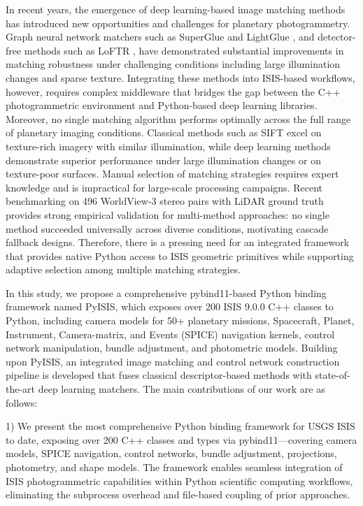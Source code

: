 \documentclass[lettersize,journal]{IEEEtran}
\newcommand{\pyisis}{PyISIS}
\begin{document}
In recent years, the emergence of deep learning-based image matching methods has introduced new opportunities and challenges for planetary photogrammetry. Graph neural network matchers such as SuperGlue \cite{sarlin2020superglue} and LightGlue \cite{lindenberger2023lightglue}, and detector-free methods such as LoFTR \cite{sun2021loftr}, have demonstrated substantial improvements in matching robustness under challenging conditions including large illumination changes and sparse texture. Integrating these methods into ISIS-based workflows, however, requires complex middleware that bridges the gap between the C++ photogrammetric environment and Python-based deep learning libraries. Moreover, no single matching algorithm performs optimally across the full range of planetary imaging conditions. Classical methods such as SIFT \cite{lowe2004sift} excel on texture-rich imagery with similar illumination, while deep learning methods demonstrate superior performance under large illumination changes or on texture-poor surfaces. Manual selection of matching strategies requires expert knowledge and is impractical for large-scale processing campaigns. Recent benchmarking on 496 WorldView-3 stereo pairs with LiDAR ground truth \cite{satellite2024benchmark} provides strong empirical validation for multi-method approaches: no single method succeeded universally across diverse conditions, motivating cascade fallback designs. Therefore, there is a pressing need for an integrated framework that provides native Python access to ISIS geometric primitives while supporting adaptive selection among multiple matching strategies.

In this study, we propose a comprehensive pybind11-based Python binding framework named \pyisis{}, which exposes over 200 ISIS 9.0.0 C++ classes to Python, including camera models for 50+ planetary missions, Spacecraft, Planet, Instrument, Camera-matrix, and Events (SPICE) navigation kernels, control network manipulation, bundle adjustment, and photometric models. Building upon \pyisis{}, an integrated image matching and control network construction pipeline is developed that fuses classical descriptor-based methods with state-of-the-art deep learning matchers. The main contributions of our work are as follows:

1) We present the most comprehensive Python binding framework for USGS ISIS to date, exposing over 200 C++ classes and types via pybind11—covering camera models, SPICE navigation, control networks, bundle adjustment, projections, photometry, and shape models. The framework enables seamless integration of ISIS photogrammetric capabilities within Python scientific computing workflows, eliminating the subprocess overhead and file-based coupling of prior approaches.
\end{document}

